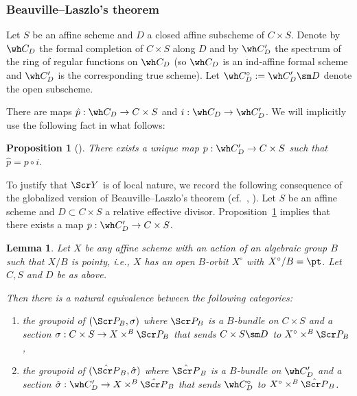 \documentclass[final]{amsart}
\newtheorem{lem}[subsubsection]{Lemma}
\newtheorem{prop}[subsubsection]{Proposition}
\theoremstyle{remark}
\theoremstyle{definition}
\numberwithin{equation}{section}
\begin{document}
\subsubsection{Beauville--Laszlo's theorem} \label{sect:BLthm}
Let $S$ be an affine scheme and $D$ a closed affine subscheme of $C\times S$.
Denote by $\wh C_D$ the formal completion of $C\times S$ along $D$ and by
$\wh C'_D$ the spectrum of the ring of regular functions on $\wh C_D$ (so $\wh C_D$ is an ind-affine formal scheme and $\wh C'_D$ is the corresponding true scheme). 
Let $\wh C^\circ_D := \wh C'_D \sm D$ denote the open subscheme.

There are maps $\hat p: \wh C_D \to C\times S$ and $i: \wh C_D \to \wh C'_D$. 
We will implicitly use the following fact in what follows:

\begin{prop}[{\cite[Proposition 2.12.6]{BD}}] \label{prop:formalext}
There exists a unique map 
$p : \wh C'_D \to C\times S$ such that $\hat p = p\circ i$. 
\end{prop}


To justify that $\Scr Y$ is of local nature, we record 
the following consequence of the globalized version of Beauville--Laszlo's theorem (cf.~\cite[Theorem 2.12.1]{BD}, \cite{BLa}). 
Let $S$ be an affine scheme and $D\subset C\times S$ a relative effective divisor.  
Proposition~\ref{prop:formalext} implies that there exists a map $p:\wh C'_D\to C\times S$. 

\begin{lem} \label{lem:B-L}
Let $X$ be any affine scheme with an action of an algebraic group $B$
such that $X/B$ is pointy, i.e., $X$ has an open $B$-orbit $X^\circ$ with $X^\circ/B=\pt$.
Let $C,S$ and $D$ be as above. 

Then there is a natural equivalence between the following categories:
\begin{enumerate}
\item the groupoid of $(\Scr P_B, \sigma)$ where $\Scr P_B$ is a $B$-bundle on $C\times S$ and a section $\sigma : C\times S \to X\times^B \Scr P_B$ 
that sends $C\times S\sm D$ to $X^\circ \times^B \Scr P_B$,
\item the groupoid of $(\hat{\Scr P}_B, \hat \sigma)$ where $\hat{\Scr P}_B$ is a $B$-bundle on $\wh C'_D$ and a section $\hat\sigma: \wh C'_D \to X\times^B \hat{\Scr P}_B$ that sends $\wh C^\circ_D$ to $X^\circ \times^B \hat{\Scr P}_B$.
\end{enumerate}
\end{lem}
\end{document}
